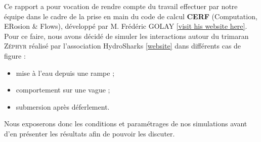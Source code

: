 \documentclass[../main.tex]{subfiles}
\begin{document}
Ce rapport a pour vocation de rendre compte du travail effectuer par notre équipe dans le cadre de la prise en main du code de calcul \textbf{CERF} (Computation, ERosion \& Flows), développé par M. Frédéric GOLAY \href{https://freddy.univ-tln.fr/}{[visit his website here]}.\\

Pour ce faire, nous avons décidé de simuler les interactions autour du trimaran \textsc{Zéphyr} réalisé par l'association HydroSharks \href{https://hydrosharks.github.io/WikiZephyr/}{[website]} dans différents cas de figure :
\begin{itemize}
    \item mise à l'eau depuis une rampe ;
    \item comportement sur une vague ;
    \item submersion après déferlement.
\end{itemize}

Nous exposerons donc les conditions et paramétrages de nos simulations avant d'en présenter les résultats afin de pouvoir les discuter.
\end{document}
